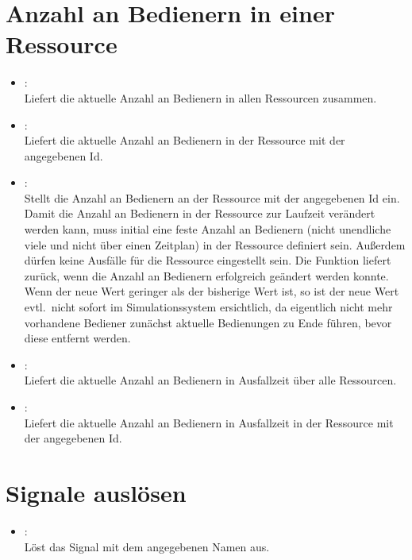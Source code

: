 \section{Anzahl an Bedienern in einer Ressource}

\begin{itemize}

\item
{}:\\
Liefert die aktuelle Anzahl an Bedienern in allen Ressourcen zusammen.
  
\item
{}:\\
Liefert die aktuelle Anzahl an Bedienern in der Ressource mit der angegebenen Id.
  
\item
{}:\\
Stellt die Anzahl an Bedienern an der Ressource mit der angegebenen Id ein.
Damit die Anzahl an Bedienern in der Ressource zur Laufzeit verändert werden kann,
muss initial eine feste Anzahl an Bedienern (nicht unendliche viele und nicht über einen Zeitplan)
in der Ressource definiert sein. Außerdem dürfen keine Ausfälle für die Ressource eingestellt sein.
Die Funktion liefert  zurück, wenn die Anzahl an Bedienern erfolgreich geändert
werden konnte. Wenn der neue Wert geringer als der bisherige Wert ist, so ist der neue Wert
evtl.\ nicht sofort im Simulationssystem ersichtlich, da eigentlich nicht mehr vorhandene Bediener
zunächst aktuelle Bedienungen zu Ende führen, bevor diese entfernt werden.

\item
{}:\\
Liefert die aktuelle Anzahl an Bedienern in Ausfallzeit über alle Ressourcen.

\item
{}:\\
Liefert die aktuelle Anzahl an Bedienern in Ausfallzeit in der Ressource mit der angegebenen Id.

\end{itemize}

\section{Signale auslösen}

\begin{itemize}

\item
{}:\\
Löst das Signal mit dem angegebenen Namen aus.

\end{itemize}

